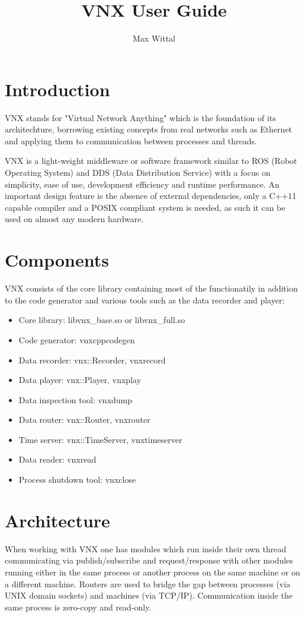 \documentclass[10pt,a4paper]{report}
\author{Max Wittal}
\title{VNX User Guide}
\begin{document}

\section{Introduction}
VNX stands for "Virtual Network Anything" which is the foundation of its architechture, borrowing existing concepts from real networks such as Ethernet and applying them to communication between processes and threads.

VNX is a light-weight middleware or software framework similar to ROS (Robot Operating System) and DDS (Data Distribution Service) with a focus on simplicity, ease of use, development efficiency and runtime performance. An important design feature is the absence of external dependencies, only a C++11 capable compiler and a POSIX compliant system is needed, as such it can be used on almost any modern hardware.

\section{Components}
VNX consists of the core library containing most of the functionatily in addition to the code generator and various tools such as the data recorder and player:

\begin{itemize}
  \item Core library: libvnx\_base.so or libvnx\_full.so
  \item Code generator: vnxcppcodegen
  \item Data recorder: vnx::Recorder, vnxrecord
  \item Data player: vnx::Player, vnxplay
  \item Data inspection tool: vnxdump
  \item Data router: vnx::Router, vnxrouter
  \item Time server: vnx::TimeServer, vnxtimeserver
  \item Data reader: vnxread
  \item Process shutdown tool: vnxclose
\end{itemize}

\section{Architecture}
When working with VNX one has modules which run inside their own thread communicating via publish/subscribe and request/response with other modules running either in the same process or another process on the same machine or on a different machine. Routers are used to bridge the gap between processes (via UNIX domain sockets) and machines (via TCP/IP). Communication inside the same process is zero-copy and read-only.
\end{document}
